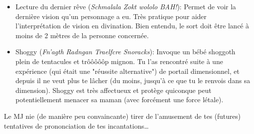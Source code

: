 {\begin{itemize}
		\item Lecture du dernier rêve (\emph{Schmalala Zokt wololo BAH!}): Permet de voir la dernière vision qu'un personnage a eu. Très pratique pour aider l'interprétation de vision en divination. Bien entendu, le sort doit être lancé à moins de 2 mètres de la personne concernée.
		
		\item Shoggy (\emph{Fn'agth Radngan Traelfcre Snoracks}): Invoque un bébé shoggoth plein de tentacules et trôôôôôp mignon. Tu l'as rencontré suite à une expérience (qui était une "réussite alternative") de portail dimensionnel, et depuis il ne veut plus te lâcher (du moins, jusqu'à ce que tu le renvois dans sa dimension). Shoggy est très affectueux et protège quiconque peut potentiellement menacer sa maman (avec forcément une force létale).
	\end{itemize}
	
	\par Le MJ nie (de manière peu convaincante) tirer de l'amusement de tes (futures) tentatives de prononciation de tes incantations\dots
}





